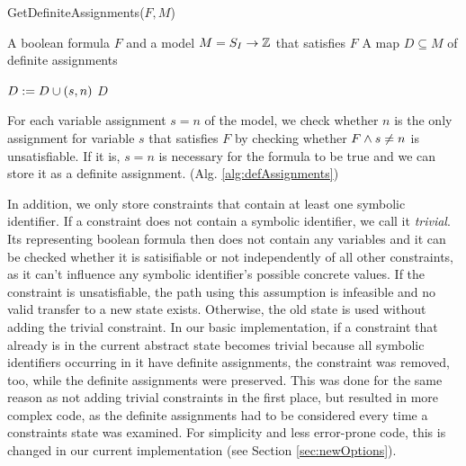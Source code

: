 \begin{algorithm}
\caption{GetDefiniteAssignments($F, M$)}
\label{alg:defAssignments}
\begin{algorithmic}
\Input A boolean formula $F$ and a model $M = S_I \rightarrow \mathbb{Z}$ that satisfies $F$
\Output A map $D\subseteq M$ of definite assignments

	\State $D := D \cup (s, n)$
\EndIf
\EndFor
\Return $D$
\end{algorithmic}
\end{algorithm}
For each variable assignment $s = n$ of the model,
we check whether $n$ is the only assignment for variable $s$ that satisfies $F$ by checking whether $F \wedge s \neq n$ is unsatisfiable.
If it is, $s = n$ is necessary for the formula to be true and we can store it as a definite assignment. (Alg. \ref{alg:defAssignments})

In addition, we only store constraints that contain at least one symbolic identifier.
If a constraint does not contain a symbolic identifier, we call it \emph{trivial}.
Its representing boolean formula then does not contain any variables and it can be checked whether it is satisifiable or not independently of all other constraints, as it can't influence any symbolic identifier's possible concrete values.
If the constraint is unsatisfiable, the path using this assumption is infeasible and no valid transfer to a new state exists.
Otherwise, the old state is used without adding the trivial constraint.
In our basic implementation, if a constraint that already is in the current abstract state becomes trivial because all symbolic identifiers occurring in it have definite assignments, the constraint was removed, too, while the definite assignments were preserved.
This was done for the same reason as not adding trivial constraints in the first place, but resulted in more complex code, as the definite assignments had to be considered every time a constraints state was examined. For simplicity and less error-prone code, this is changed in our current implementation (see Section \ref{sec:newOptions}).

